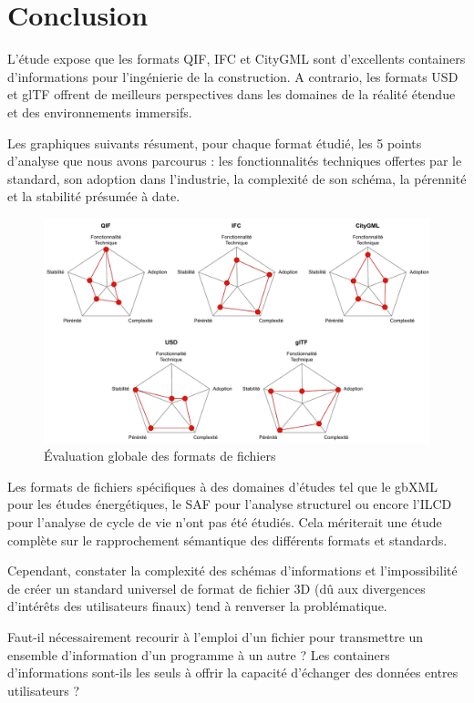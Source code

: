 \section{Conclusion}

L'étude expose que les formats QIF, IFC et CityGML sont d'excellents containers d'informations pour l'ingénierie de la construction. A contrario, les formats USD et glTF offrent de meilleurs perspectives dans les domaines de la réalité étendue et des environnements immersifs. 

Les graphiques suivants résument, pour chaque format étudié, les 5 points d'analyse que nous avons parcourus : les fonctionnalités techniques offertes par le standard, son adoption dans l'industrie, la complexité de son schéma, la pérennité et la stabilité présumée à date. 

\begin{figure}[!h]
    \centering
    \includegraphics[width=1\linewidth]{imports/3DFiles_Evaluation.pdf}
    \caption{Évaluation globale des formats de fichiers}
    \label{fig:enter-label}
\end{figure}

Les formats de fichiers spécifiques à des domaines d'études tel que le gbXML pour les études énergétiques, le SAF pour l'analyse structurel ou encore l'ILCD pour l'analyse de cycle de vie n'ont pas été étudiés. Cela mériterait une étude complète sur le rapprochement sémantique des différents formats et standards. 

Cependant, constater la complexité des schémas d'informations et l'impossibilité de créer un standard universel de format de fichier 3D (dû aux divergences d'intérêts des utilisateurs finaux) tend à renverser la problématique.

Faut-il nécessairement recourir à l'emploi d'un fichier pour transmettre un ensemble d'information d'un programme à un autre ?
Les containers d'informations sont-ils les seuls à offrir la capacité d'échanger des données entres utilisateurs ?

